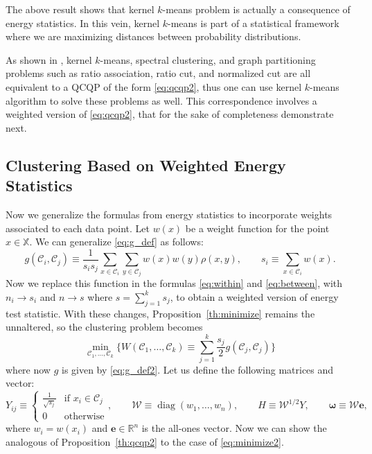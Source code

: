 \documentclass[aps,preprint,nofootinbib,floatfix]{revtex4-1}
\DeclareMathOperator{\diag}{diag}
\newcommand\C{{\mathcal{C}}}
\begin{document}
The above result shows that 
kernel $k$-means problem is actually a consequence
of energy statistics. In this vein, kernel $k$-means is part of a
statistical framework where we are maximizing distances between probability
distributions.

As shown in \cite{Dhillon}, kernel $k$-means, spectral clustering,
and graph partitioning problems such as ratio association, ratio cut, and
normalized cut are all equivalent to a QCQP of the form \eqref{eq:qcqp2}, thus
one can use kernel $k$-means algorithm to solve these problems as well.
This correspondence involves a weighted version of \eqref{eq:qcqp2}, that
for the sake of completeness demonstrate next.


\subsection{Clustering Based on Weighted Energy Statistics}

Now we generalize the formulas from energy statistics to incorporate
weights associated to each data point.
Let $w(x)$ be a weight function for the point $x \in \mathbb{X}$.
We can generalize \eqref{eq:g_def} as follows:
\begin{equation}
\label{eq:g_def2}
g(\C_i, \C_j) \equiv \dfrac{1}{s_i s_j} \sum_{x\in \C_i}\sum_{y\in\C_j}
w(x)w(y) \rho(x,y), \qquad s_i \equiv \sum_{x\in\C_i} w(x).
\end{equation}
Now we replace this function in the formulas \eqref{eq:within} and
\eqref{eq:between}, with 
$n_i \to s_i$ and $n \to s$ where $s = \sum_{j=1}^k s_j$,
to obtain a weighted version of energy test statistic. With these
changes, Proposition~\ref{th:minimize} remains the unnaltered, so the
clustering problem becomes
\begin{equation}
\label{eq:minimize2}
\min_{\C_1, \dotsc, \C_k} 
\bigg\{
W(\C_1,\dotsc,\C_k) \equiv \sum_{j=1}^k \dfrac{s_j}{2} g(\C_j,\C_j)
\bigg\}
\end{equation}
where now $g$ is given by \eqref{eq:g_def2}. 
Let us define the following matrices and vector:
\begin{equation}
\label{eq:weighted_matrices}
Y_{ij} \equiv \begin{cases}
\tfrac{1}{\sqrt{s_j}} & \mbox{if $x_i \in \C_j$} \\
0 & \mbox{otherwise}
\end{cases}, \qquad
\mathcal{W} \equiv \diag(w_1,\dotsc,w_n), \qquad
H \equiv \mathcal{W}^{1/2} Y, \qquad
\bm{\omega} \equiv \mathcal{W} \bm{e},
\end{equation}
where $w_i = w(x_i)$ and $\bm{e} \in \mathbb{R}^n$ is the all-ones
vector. Now we can show the analogous of
Proposition~\ref{th:qcqp2} to the case of \eqref{eq:minimize2}.
\end{document}
